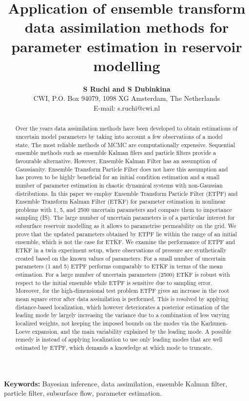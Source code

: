 \documentclass[12, a4paper]{article}
\numberwithin{equation}{section}
\begin{document}
	\title{\textbf{	Application of ensemble transform data assimilation methods for parameter estimation in reservoir modelling}}
	\author{\small{\textbf{S Ruchi and S Dubinkina}} \\ \small{CWI, P.O. Box 94079, 1098 XG Amsterdam, The Netherlands} \\ \small{E-mail: s.ruchi@cwi.nl}}
	
	\date{}
	\maketitle
	
	\begin{abstract}
		Over the years data assimilation methods have been developed to obtain estimations of uncertain model parameters by taking into account a few observations of a model state. The most reliable methods of MCMC are computationally expensive.   
		Sequential ensemble methods such as ensemble Kalman filers and particle filters provide a favourable alternative.
		However, Ensemble Kalman Filter has an assumption of Gaussianity. Ensemble Transform Particle Filter does not have this assumption and has proven to be highly beneficial for an initial condition estimation and a small number of parameter estimation in chaotic dynamical systems with non-Gaussian distributions. In this paper we employ Ensemble Transform Particle Filter (ETPF) and Ensemble Transform Kalman Filter (ETKF) for parameter estimation in nonlinear problems with 1, 5, and 2500 uncertain parameters and compare them to importance sampling (IS). The large number of uncertain parameters is of a particular interest for subsurface reservoir modelling as it allows to parametrise permeability on the grid. 
		We prove that the updated parameters obtained by ETPF lie within the range of an initial ensemble, which is not the case for ETKF. We examine the performance of ETPF and ETKF in a twin experiment setup, where observations of pressure are synthetically created based on the known values of parameters. 	 
		For a small number of uncertain parameters (1 and 5) ETPF performs comparably to ETKF in terms of the mean estimation.
		For a large number of uncertain parameters (2500) ETKF is robust with respect to the initial ensemble while ETPF is 
		sensitive due to sampling error. 
		Moreover, for the high-dimensional test problem ETPF gives an increase in the root mean square error after data assimilation is performed. 
		This is resolved by applying distance-based localization, 
		which however deteriorates a posterior estimation of the leading mode by largely increasing the variance
		due to a combination of less varying localized weights, not keeping the imposed bounds on the modes via the Karhunen-Loeve 
		expansion, and the main variability explained by the leading mode. A possible remedy is instead of applying localization to use only leading modes 
		that are well estimated by ETPF, which demands a knowledge at which mode to truncate. 
	\end{abstract}
 {\bf Keywords:} Bayesian inference, data assimilation, ensemble Kalman filter, particle filter, subsurface flow, parameter estimation.
\end{document}
